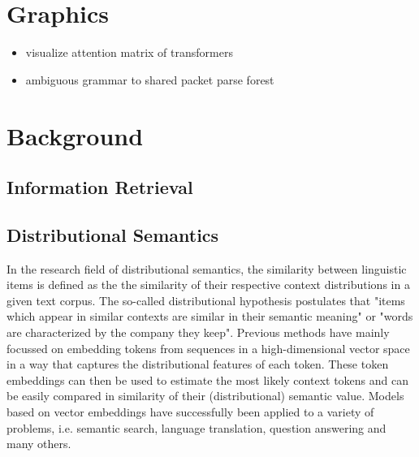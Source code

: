 \documentclass[10pt]{report}
\begin{document}
\section{Graphics}
\begin{itemize}
    \item visualize attention matrix of transformers
    \item ambiguous grammar to shared packet parse forest
\end{itemize}

\section{Background}

\subsection{Information Retrieval}
\subsection{Distributional Semantics}

In the research field of distributional semantics, the similarity between linguistic 
items is defined as the the similarity of their respective context distributions in a 
given text corpus. The so-called distributional hypothesis postulates that "items which 
appear in similar contexts are similar in their semantic meaning" or "words are 
characterized by the company they keep".
Previous methods have mainly focussed on embedding tokens from sequences in a 
high-dimensional vector space in a way that captures the distributional features of each 
token. These token embeddings can then be used to estimate the most likely context tokens 
and can be easily compared in similarity of their (distributional) semantic value.
Models based on vector embeddings have successfully been applied to a variety of 
problems, i.e. semantic search, language translation, question answering and many others.
\end{document}
